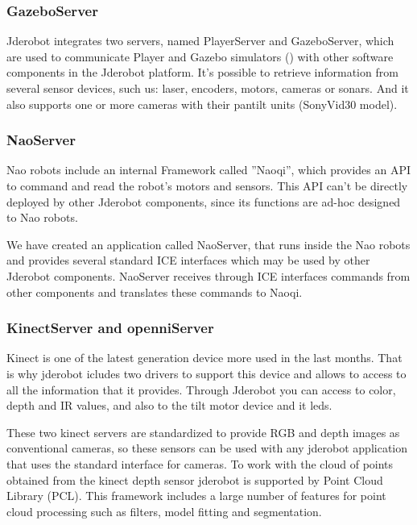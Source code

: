 \documentclass[twocolumn]{svjour3}          %
\begin{document}
\subsubsection{GazeboServer}
\label{subsec:gazeboserver}

Jderobot integrates two servers, named PlayerServer and GazeboServer, which are used to communicate Player and Gazebo simulators (\cite{koening2004}) with other software components in the Jderobot platform. It's possible to retrieve information from several sensor devices, such us: laser, encoders, motors, cameras or sonars. And it also supports one or more cameras with their pantilt units (SonyVid30 model).

\subsubsection{NaoServer}

Nao robots include an internal Framework called ''Naoqi'', which provides an API to command and read the robot's motors and sensors. This API can't be directly deployed by other Jderobot components, since its functions are ad-hoc designed to Nao robots.

We have created an application called NaoServer, that runs inside the Nao robots and provides several standard ICE interfaces which may be used by other Jderobot components. NaoServer receives through ICE interfaces commands from other components and translates these commands to Naoqi.

\subsubsection{KinectServer and openniServer}

Kinect is one of the latest generation device more used in the last months. That is why jderobot icludes two drivers to support this device and allows to access to all the information that it provides. Through Jderobot you can access to color, depth and IR values, and also to the tilt motor device and it leds.

These two kinect servers are standardized to provide RGB and depth images as conventional cameras, so these sensors can be used with any jderobot application that uses the standard interface for cameras.
To work with the cloud of points obtained from the kinect  depth sensor jderobot  is supported by Point Cloud Library (PCL). This framework includes a large number of features for point cloud processing such as filters, model fitting and segmentation. 
\end{document}
